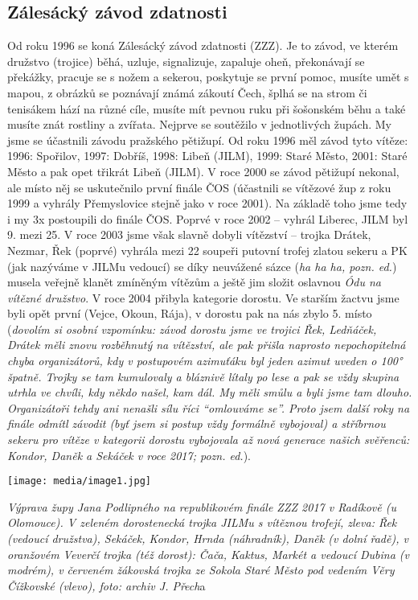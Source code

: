 \subsection{Zálesácký závod
zdatnosti}\label{zuxe1lesuxe1ckuxfd-zuxe1vod-zdatnosti}

Od roku 1996 se koná Zálesácký závod zdatnosti (ZZZ). Je to závod, ve
kterém družstvo (trojice) běhá, uzluje, signalizuje, zapaluje oheň,
překonávají se překážky, pracuje se s nožem a sekerou, poskytuje se
první pomoc, musíte umět s mapou, z obrázků se poznávají známá zákoutí
Čech, šplhá se na strom či tenisákem hází na různé cíle, musíte mít
pevnou ruku při šošonském běhu a také musíte znát rostliny a zvířata.
Nejprve se soutěžilo v jednotlivých župách. My jsme se účastnili závodu
pražského pětižupí. Od roku 1996 měl závod tyto vítěze: 1996: Spořilov,
1997: Dobříš, 1998: Libeň (JILM), 1999: Staré Město, 2001: Staré Město a
pak opet třikrát Libeň (JILM). V roce 2000 se závod pětižupí nekonal,
ale místo něj se uskutečnilo první finále ČOS (účastnili se vítězové žup
z roku 1999 a vyhrály Přemyslovice stejně jako v roce 2001). Na základě
toho jsme tedy i my 3x postoupili do finále ČOS. Poprvé v roce 2002 --
vyhrál Liberec, JILM byl 9. mezi 25. V roce 2003 jsme však slavně dobyli
vítězství -- trojka Drátek, Nezmar, Řek (poprvé) vyhrála mezi 22 soupeři
putovní trofej zlatou sekeru a PK (jak nazýváme v JILMu vedoucí) se díky
neuvážené sázce (\emph{ha ha ha, pozn. ed.}) musela veřejně klanět
zmíněným vítězům a ještě jim složit oslavnou \emph{Ódu na vítězné
družstvo}. V roce 2004 přibyla kategorie dorostu. Ve starším žactvu jsme
byli opět první (Vejce, Okoun, Rája), v dorostu pak na nás zbylo 5.
místo (\emph{dovolím si osobní vzpomínku: závod dorostu jsme ve trojici
Řek, Ledňáček, Drátek měli znovu rozběhnutý na vítězství, ale pak přišla
naprosto nepochopitelná chyba organizátorů, kdy v postupovém azimuťáku
byl jeden azimut uveden o 100° špatně. Trojky se tam kumulovaly a
bláznivě lítaly po lese a pak se vždy skupina utrhla ve chvíli, kdy
někdo našel, kam dál. My měli smůlu a byli jsme tam dlouho. Organizátoři
tehdy ani nenašli sílu říci ``omlouváme se''. Proto jsem další roky na
finále odmítl závodit (byť jsem si postup vždy formálně vybojoval) a
stříbrnou sekeru pro vítěze v kategorii dorostu vybojovala až nová
generace našich svěřenců: Kondor, Daněk a Sekáček v roce 2017; pozn.
ed.}).

\texttt{[image: media/image1.jpg]}

\emph{Výprava župy Jana Podlipného na republikovém finále ZZZ 2017 v
Radíkově (u Olomouce). V zeleném dorostenecká trojka JILMu s vítěznou
trofejí, zleva: Řek (vedoucí družstva), Sekáček, Kondor, Hrnda
(náhradník), Daněk (v dolní řadě), v oranžovém Veverčí trojka (též
dorost): Čača, Kaktus, Markét a vedoucí Dubina (v modrém), v červeném
žákovská trojka ze Sokola Staré Město pod vedením Věry Čížkovské
(vlevo), foto: archiv J. Přech}a

